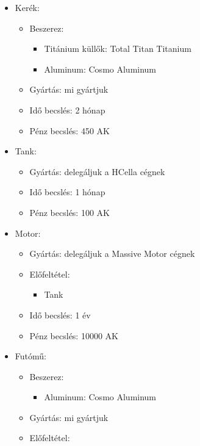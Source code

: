 \documentclass[12pt]{report}
\begin{document}
\begin{itemize}
    \item Kerék:
        \begin{itemize}
            \item Beszerez:
                \begin{itemize}
                    \item Titánium küllők: Total Titan Titanium
                    \item Aluminum: Cosmo Aluminum
                \end{itemize}
            \item Gyártás: mi gyártjuk
            \item Idő becslés: 2 hónap
            \item Pénz becslés: 450 AK
        \end{itemize}
    \item Tank:
        \begin{itemize}
            \item Gyártás: delegáljuk a HCella cégnek
            \item Idő becslés: 1 hónap
            \item Pénz becslés: 100 AK
        \end{itemize}
    \item Motor:
        \begin{itemize}
            \item Gyártás: delegáljuk a Massive Motor cégnek
            \item Előfeltétel: 
                \begin{itemize}
                    \item Tank
                \end{itemize}
            \item Idő becslés: 1 év
            \item Pénz becslés: 10000 AK
        \end{itemize}
    \item Futómű:
        \begin{itemize}
            \item Beszerez:
                \begin{itemize}
                    \item Aluminum: Cosmo Aluminum
                \end{itemize}
            \item Gyártás: mi gyártjuk
            \item Előfeltétel: 

\end{itemize}
\end{itemize}
\end{document}
